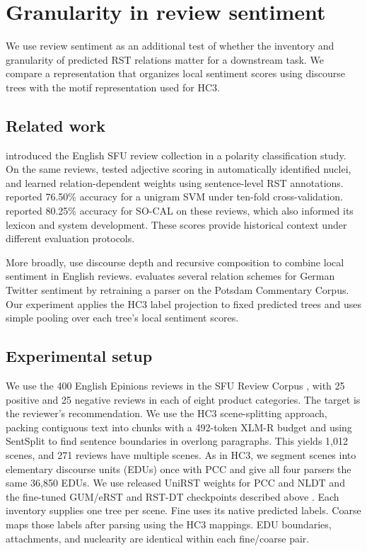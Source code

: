 \section{Granularity in review sentiment}
\label{sec:review-sentiment}

We use review sentiment as an additional test of whether the inventory and
granularity of predicted RST relations matter for a downstream task. We
compare a representation that organizes local sentiment scores using
discourse trees with the motif representation used for HC3.

\subsection{Related work}

\citet{taboada_analyzing_2004} introduced the English SFU review
collection in a polarity classification study. On the same reviews,
\citet{voll_adjective_2007} tested adjective scoring in automatically
identified nuclei, and \citet{balage_discourse_2012} learned
relation-dependent weights using sentence-level RST annotations.
\citet{brooke_crosslingual_2009} reported 76.50\% accuracy for a unigram
SVM under ten-fold cross-validation. \citet{taboada_lexicon_2011}
reported 80.25\% accuracy for SO-CAL on these reviews, which also informed
its lexicon and system development. These scores provide historical
context under different evaluation protocols.

More broadly, \citet{bhatia_document_sentiment_2015} use discourse depth
and recursive composition to combine local sentiment in English reviews.
\citet[\S6.4.2]{sidarenka_german_twitter_2019} evaluates several relation
schemes for German Twitter sentiment by retraining a parser on the
Potsdam Commentary Corpus. Our experiment applies the HC3 label
projection to fixed predicted trees and uses simple pooling over each
tree's local sentiment scores.

\subsection{Experimental setup}

We use the 400 English Epinions reviews in the SFU Review Corpus
\citep{taboada_sfu_2008}, with 25 positive and 25 negative reviews in each
of eight product categories. The target is the reviewer's recommendation.
We use the HC3 scene-splitting approach, packing contiguous text into
chunks with a 492-token XLM-R budget and using SentSplit to find sentence
boundaries in overlong paragraphs. This yields 1,012 scenes, and 271 reviews
have multiple scenes. As in HC3, we segment scenes into
elementary discourse units (EDUs) once with PCC and give all four parsers
the same 36,850 EDUs. We use released UniRST weights for PCC and NLDT and
the fine-tuned GUM/eRST and RST-DT checkpoints described above
\citep{chistova_bridging_2025}. Each inventory supplies one tree per scene.
Fine uses its native predicted labels. Coarse maps those labels after
parsing using the HC3 mappings. EDU boundaries, attachments, and
nuclearity are identical within each fine/coarse pair.

